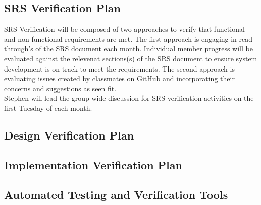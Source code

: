 \documentclass[12pt, titlepage]{article}
\begin{document}
\subsection{SRS Verification Plan}



SRS Verification will be composed of two approaches to verify that functional and non-functional requirements are met. The first approach is engaging in read through's of the SRS document each month. Individual member progress will be evaluated against the relevenat sections(s) of the SRS document to ensure system  development is on track to meet the requirements. The second approach is evaluating issues created by classmates on GitHub and incorporating their concerns and suggestions as seen fit.\\

Stephen will lead the group wide discussion for SRS verification activities on the first Tuesday of each month.\\

\subsection{Design Verification Plan}






\subsection{Implementation Verification Plan}



\subsection{Automated Testing and Verification Tools}
\end{document}
